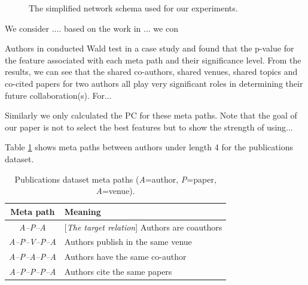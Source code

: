 \begin{figure}[t]
\centering
{}
\caption{The simplified network schema used for our experiments.} \label{Fig:expSchema}
\end{figure}


We consider .... based on the work in ... we con

Authors in \cite{sun2011ASONAM} conducted Wald test in a case study and found that the p-value for the feature associated with each meta path and their significance level. From the results, we can see that the shared co-authors, shared venues, shared topics and co-cited papers for two authors all play very significant roles in determining their future collaboration(s). For...

Similarly we only calculated the PC for these meta paths. Note that the goal of our paper is not to select the best features but to show the strength of using...

Table \ref{table_publications} shows meta paths between authors under length 4 for the publications dataset.



\begin{table}[h]
\centering
\caption{Publications dataset meta paths (\textit{A}=author, \textit{P}=paper, \textit{A}=venue).}
\scriptsize
\label{table_publications}
\begin{tabular}{|c|l|} \hline
\textbf{Meta path} & \textbf{Meaning} \\ \hline

\textit{A--P--A} & [\textit{The target relation}] Authors are coauthors \\ \hline
\textit{A--P--V--P--A} & Authors publish in the same venue \\ \hline
\textit{A--P--A--P--A} & Authors have the same co-author \\ \hline
\textit{A--P--P--P--A} & Authors cite the same papers \\ \hline

\end{tabular}


\end{table}

